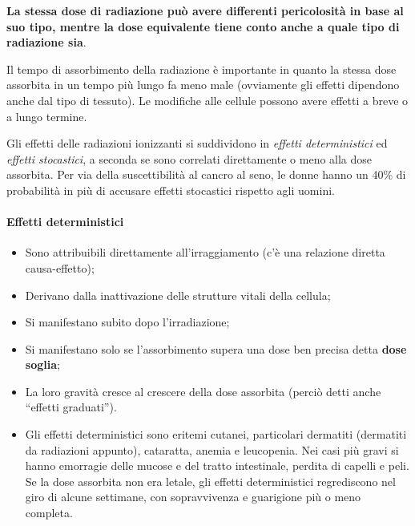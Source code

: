 \documentclass[a4paper,11pt,twoside,openany]{book}
\theoremstyle{definition}
\theoremstyle{plain}
\theoremstyle{plain}
\theoremstyle{definition}
\begin{document}
\textbf{La stessa dose di radiazione può avere differenti pericolosità in base al suo tipo, mentre la dose equivalente tiene conto anche a quale tipo di radiazione sia}.

Il tempo di assorbimento della radiazione è importante in quanto la stessa dose assorbita in un tempo più lungo fa meno male (ovviamente gli effetti dipendono anche dal tipo di tessuto). Le modifiche alle cellule possono avere effetti a breve o a lungo termine.

Gli effetti delle radiazioni ionizzanti si suddividono in \emph{effetti deterministici} ed \emph{effetti stocastici}, a seconda se sono correlati direttamente o meno alla dose assorbita. Per via della suscettibilità al cancro al seno, le donne hanno un 40\% di probabilità in più di accusare effetti stocastici rispetto agli uomini.

\paragraph{Effetti deterministici} %
\begin{itemize}
\item Sono attribuibili direttamente all'irraggiamento (c'è una relazione diretta causa-effetto);
\item Derivano dalla inattivazione delle strutture vitali della cellula;
\item Si manifestano subito dopo l'irradiazione;
\item Si manifestano solo se l'assorbimento supera una dose ben precisa detta \textbf{dose soglia};
\item La loro gravità cresce al crescere della dose assorbita (perciò detti anche ``effetti graduati'').
\item Gli effetti deterministici sono eritemi cutanei, particolari dermatiti (dermatiti da radiazioni appunto), cataratta, anemia e leucopenia. Nei casi più gravi si hanno emorragie delle mucose e del tratto intestinale, perdita di capelli e peli. Se la dose assorbita non era letale, gli effetti deterministici regrediscono nel giro di alcune settimane, con sopravvivenza e guarigione più o meno completa.
\end{itemize}
\end{document}
